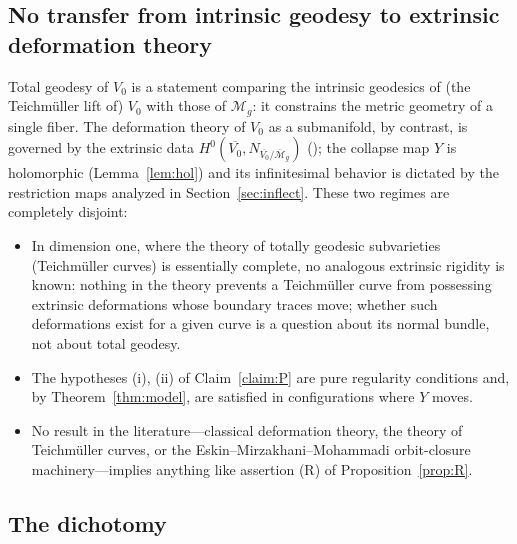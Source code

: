 \documentclass[11pt]{amsart}
\newcommand{\M}{\mathcal{M}}
\theoremstyle{plain}
\theoremstyle{definition}
\theoremstyle{remark}
\begin{document}
\subsection{No transfer from intrinsic geodesy to extrinsic deformation theory}

Total geodesy of $V_0$ is a statement comparing the intrinsic geodesics of (the
Teichm\"uller lift of) $V_0$ with those of $\M_g$: it constrains the metric
geometry of a single fiber. The deformation theory of $V_0$ as a submanifold,
by contrast, is governed by the extrinsic data
$H^0(\overline{V_0},N_{\overline{V_0}/\overline{\M}_g})$
(\cite{Sernesi, HartshorneDef}); the collapse map $Y$ is holomorphic
(Lemma~\ref{lem:hol}) and its infinitesimal behavior is dictated by the restriction
maps analyzed in Section~\ref{sec:inflect}. These two regimes are completely
disjoint:

\begin{itemize}
\item In dimension one, where the theory of totally geodesic subvarieties (Teichm\"uller
curves) is essentially complete, no analogous extrinsic rigidity is known: nothing in
the theory prevents a Teichm\"uller curve from possessing extrinsic deformations whose
boundary traces move; whether such deformations exist for a given curve is a question
about its normal bundle, not about total geodesy.
\item The hypotheses (i), (ii) of Claim~\ref{claim:P} are pure regularity conditions
and, by Theorem~\ref{thm:model}, are satisfied in configurations where $Y$ moves.
\item No result in the literature---classical deformation theory, the theory of
Teichm\"uller curves, or the Eskin--Mirzakhani--Mohammadi orbit-closure
machinery---implies anything like assertion (R) of Proposition~\ref{prop:R}.
\end{itemize}

\subsection{The dichotomy}
\end{document}
